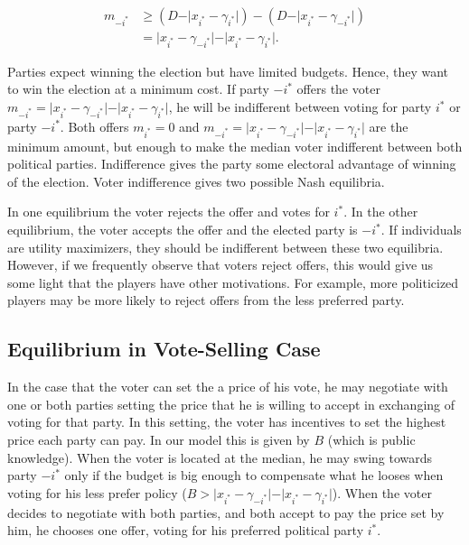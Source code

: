 \documentclass[onesided]{article}\usepackage[]{graphicx}\usepackage[]{color}
\begin{document}
\begin{align*}
    m_{-i^*} &\geq \left( D-\vert x_{i^*}-\gamma_{i^*} \vert \right) - \left( D-\vert x_{i^*}-\gamma_{-i^*} \vert \right)\\
     &=\vert x_{i^*}-\gamma_{-i^*} \vert- \vert x_{i^*}-\gamma_{i^*} \vert . 
\end{align*}


Parties expect winning the election but have limited budgets. Hence, they want to win the election at a minimum cost. If party $-i^*$ offers the voter $m_{-i^*}=\vert x_{i^*}-\gamma_{-i^*} \vert- \vert x_{i^*}-\gamma_{i^*} \vert$, he will be indifferent between voting for party $i^*$ or party $-i^*$. Both offers $m_{i^*}=0$ and $m_{-i^*}=\vert x_{i^*}-\gamma_{-i^*} \vert- \vert x_{i^*}-\gamma_{i^*} \vert$ are the minimum amount, but enough to make the median voter indifferent between both political parties. {\color{red}Indifference gives the party some electoral advantage of winning of the election}. Voter indifference gives two possible Nash equilibria.

In one equilibrium the voter rejects the offer and votes for $i^*$. In the other equilibrium, the voter accepts the offer and the elected party is $-i^*$. If individuals are utility maximizers, they should be indifferent between these two equilibria. {\color{red}However, if we frequently observe that voters reject offers, this would give us some light that the players have other motivations. For example, more politicized players may be more likely to reject offers from the less preferred party}.
  

 
 
\subsection{Equilibrium in Vote-Selling Case}

In the case that the voter can set the a price of his vote, he may negotiate with one or both parties setting the price that he is willing to accept in exchanging of voting for that party. In this setting, the voter has incentives to set the highest price each party can pay. In our model this is given by $B$ ({\color{red}which is public knowledge}). When the voter is located at the median, he may swing towards party $-i^*$ only if the budget is big enough to compensate what he looses when voting for his less prefer policy ($B> \vert x_{i^*}-\gamma_{-i^*} \vert- \vert x_{i^*}-\gamma_{i^*} \vert$). When the voter decides to negotiate with both parties, and both accept to pay the price set by him, he chooses one offer, voting for his preferred political party $i^*$. 
\end{document}
